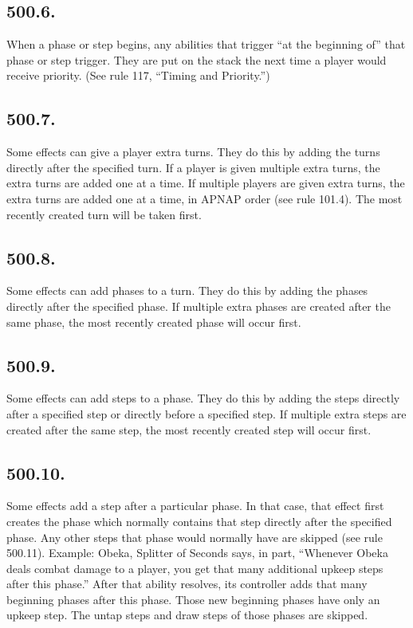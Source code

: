 \subsection*{500.6.}
When a phase or step begins, any abilities that trigger “at the beginning of” that phase or step trigger. They are put on the stack the next time a player would receive priority. (See rule 117, “Timing and Priority.”)

\subsection*{500.7.}
Some effects can give a player extra turns. They do this by adding the turns directly after the specified turn. If a player is given multiple extra turns, the extra turns are added one at a time. If multiple players are given extra turns, the extra turns are added one at a time, in APNAP order (see rule 101.4). The most recently created turn will be taken first.

\subsection*{500.8.}
Some effects can add phases to a turn. They do this by adding the phases directly after the specified phase. If multiple extra phases are created after the same phase, the most recently created phase will occur first.

\subsection*{500.9.}
Some effects can add steps to a phase. They do this by adding the steps directly after a specified step or directly before a specified step. If multiple extra steps are created after the same step, the most recently created step will occur first.

\subsection*{500.10.}
Some effects add a step after a particular phase. In that case, that effect first creates the phase which normally contains that step directly after the specified phase. Any other steps that phase would normally have are skipped (see rule 500.11).
Example: Obeka, Splitter of Seconds says, in part, “Whenever Obeka deals combat damage to a player, you get that many additional upkeep steps after this phase.” After that ability resolves, its controller adds that many beginning phases after this phase. Those new beginning phases have only an upkeep step. The untap steps and draw steps of those phases are skipped.

